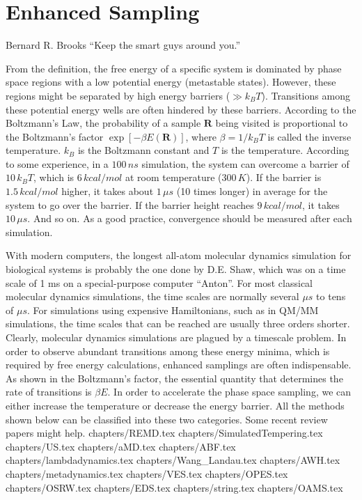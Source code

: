 \chapter{Enhanced Sampling\label{chapter:ES}}
\begin{chapquote}{Bernard R. Brooks%
	}
	``Keep the smart guys around you.''
\end{chapquote}
From the definition, the free energy of a specific system is dominated by phase space regions with a low potential energy (metastable states). However, these regions might be separated by high energy barriers ($\gg k_BT$). Transitions among these potential energy wells are often hindered by these barriers. According to the Boltzmann's Law, the probability of a sample $\mathbf{R}$ being visited is proportional to the Boltzmann's factor $\exp{\left[-\beta E(\mathbf{R})\right]}$, where $\beta=1/k_BT$ is called the inverse temperature. $k_B$ is the Boltzmann constant and $T$ is the temperature. According to some experience, in a $100\, ns$ simulation, the system can overcome a barrier of $10\, k_BT$, which is $6\, kcal/mol$ at room temperature ($300\, K$). If the barrier is $1.5\, kcal/mol$ higher, it takes about $1\, \mu s$ (10 times longer) in average for the system to go over the barrier. If the barrier height reaches $9\, kcal/mol$, it takes $10\,\mu s$. And so on. As a good practice, convergence should be measured after each simulation.\cite{GrossfieldLJCMS2018}

With modern computers, the longest all-atom molecular dynamics simulation for biological systems is probably the one done by D.E. Shaw, which was on a time scale of 1 ms on a special-purpose computer ``Anton''. For most classical molecular dynamics simulations, the time scales are normally several $\mu s$ to tens of $\mu s$. For simulations using expensive Hamiltonians, such as in QM/MM simulations, the time scales that can be reached are usually three orders shorter. Clearly, molecular dynamics simulations are plagued by a timescale problem. In order to observe abundant transitions among these energy minima, which is required by free energy calculations, enhanced samplings are often indispensable. As shown in the Boltzmann's factor, the essential quantity that determines the rate of transitions is $\beta E$. In order to accelerate the phase space sampling, we can either increase the temperature or decrease the energy barrier. All the methods shown below can be classified into these two categories. Some recent review papers might help.\cite{ZuckermanARB2011,BernardiBBA2015,KamenikPCCP2022,ChenCOSB2022}
\clearpage 
 {chapters/REMD.tex}
\clearpage
 {chapters/SimulatedTempering.tex}
\clearpage
 {chapters/US.tex}
\clearpage
 {chapters/aMD.tex}
\clearpage
 {chapters/ABF.tex}
\clearpage 
 {chapters/lambdadynamics.tex}
\clearpage 
 {chapters/Wang_Landau.tex}
\clearpage 
 {chapters/AWH.tex}
\clearpage
 {chapters/metadynamics.tex}
\clearpage 
 {chapters/VES.tex}
\clearpage 
 {chapters/OPES.tex}
\clearpage 
 {chapters/OSRW.tex}
\clearpage
 {chapters/EDS.tex}
%
\clearpage
 {chapters/string.tex}
\clearpage
 {chapters/OAMS.tex}
